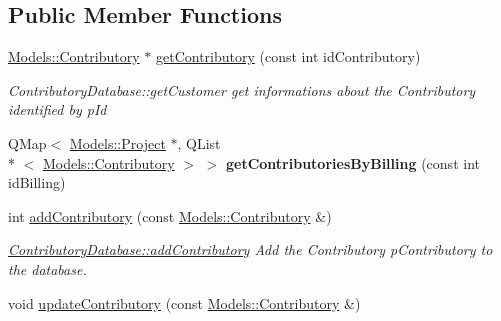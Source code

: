 \subsection*{Public Member Functions}
\begin{DoxyCompactItemize}
\item 
\hyperlink{classModels_1_1Contributory}{Models\-::\-Contributory} $\ast$ \hyperlink{classDatabases_1_1ContributoryDatabase_a76b6541c4b770a51b8d1a449631a5ffd}{get\-Contributory} (const int id\-Contributory)
\begin{DoxyCompactList}\small\item\em Contributory\-Database\-::get\-Customer get informations about the Contributory identified by {\itshape p\-Id} \end{DoxyCompactList}\item 
\hypertarget{classDatabases_1_1ContributoryDatabase_afbf7fdec4e6998b36a04f3c31b8b6848}{Q\-Map$<$ \hyperlink{classModels_1_1Project}{Models\-::\-Project} $\ast$, Q\-List\\*
$<$ \hyperlink{classModels_1_1Contributory}{Models\-::\-Contributory} $>$ $>$ {\bfseries get\-Contributories\-By\-Billing} (const int id\-Billing)}\label{classDatabases_1_1ContributoryDatabase_afbf7fdec4e6998b36a04f3c31b8b6848}

\item 
int \hyperlink{classDatabases_1_1ContributoryDatabase_abd7bf49a62d8e267d898936122b5c2a7}{add\-Contributory} (const \hyperlink{classModels_1_1Contributory}{Models\-::\-Contributory} \&)
\begin{DoxyCompactList}\small\item\em \hyperlink{classDatabases_1_1ContributoryDatabase_abd7bf49a62d8e267d898936122b5c2a7}{Contributory\-Database\-::add\-Contributory} Add the Contributory {\itshape p\-Contributory} to the database. \end{DoxyCompactList}\item 
\hypertarget{classDatabases_1_1ContributoryDatabase_a748062c6793dd80115ded9bffba75b6a}{void \hyperlink{classDatabases_1_1ContributoryDatabase_a748062c6793dd80115ded9bffba75b6a}{update\-Contributory} (const \hyperlink{classModels_1_1Contributory}{Models\-::\-Contributory} \&)}\label{classDatabases_1_1ContributoryDatabase_a748062c6793dd80115ded9bffba75b6a}


\end{DoxyCompactItemize}
